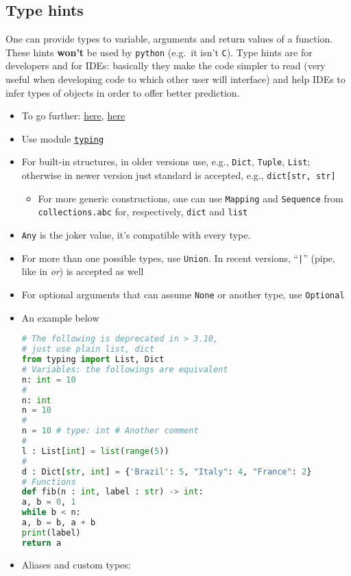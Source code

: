 \documentclass[a4paper,12pt,%
              final%
              ]{article}
\begin{document}
\subsection{Type hints}
One can provide types to variable, arguments and return values of a function. These hints \textbf{won't} be used by \texttt{python} (e.g.\ it isn't \texttt{C}). Type hints are for developers and for IDEs: basically they make the code simpler to read (very useful when developing code to which other user will interface) and help IDEs to infer types of objects in order to offer better prediction.
\begin{itemize}
  \item To go further: \href{https://stackoverflow.com/a/32558710}{here}, \href{https://www.infoworld.com/article/3630372/get-started-with-python-type-hints.html}{here}
  \item Use module \href{https://docs.python.org/3/library/typing.html}{\texttt{typing}}
  \item For built-in structures, in older versions use, e.g., \texttt{Dict}, \texttt{Tuple}, \texttt{List}; otherwise in newer version just standard is accepted, e.g., \verb|dict[str, str]|
    \begin{itemize}
      \item For more generic constructions, one can use \texttt{Mapping} and \texttt{Sequence} from \texttt{collections.abc} for, respectively, \texttt{dict} and \texttt{list}
    \end{itemize}
  \item \texttt{Any} is the joker value, it's compatible with every type.
  \item For more than one possible types, use \verb|Union|. In recent versions, ``\verb!|!'' (pipe, like in \emph{or}) is accepted as well
  \item For optional arguments that can assume \verb|None| or another type, use \verb|Optional|
  \item An example below
\begin{lstlisting}[language=python]
# The following is deprecated in > 3.10,
# just use plain list, dict
from typing import List, Dict
# Variables: the followings are equivalent
n: int = 10
#
n: int
n = 10
#
n = 10 # type: int # Another comment
#
l : List[int] = list(range(5))
#
d : Dict[str, int] = {'Brazil': 5, "Italy": 4, "France": 2}
# Functions
def fib(n : int, label : str) -> int:
a, b = 0, 1
while b < n:
a, b = b, a + b
print(label)
return a
\end{lstlisting}
  \item Aliases and custom types:

\end{itemize}
\end{document}
